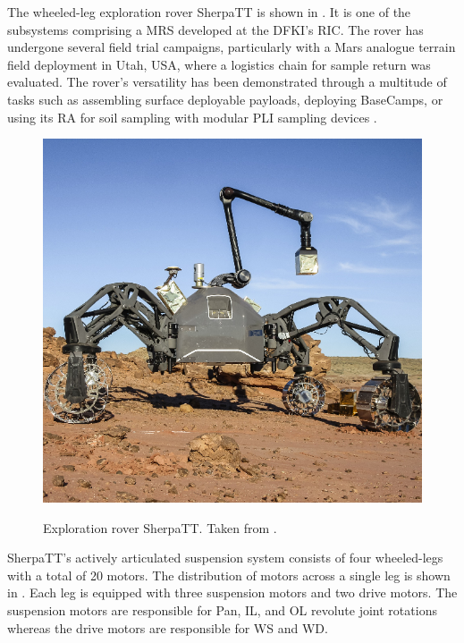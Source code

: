 The wheeled-leg exploration rover SherpaTT is shown in . It is one of the subsystems comprising a \ac{MRS} developed at the \ac{DFKI}'s \ac{RIC}. The rover has undergone several field trial campaigns, particularly with a Mars analogue terrain field deployment  in Utah, USA, where a logistics chain for sample return was evaluated. The rover's versatility has been demonstrated through a multitude of tasks such as assembling surface deployable payloads, deploying BaseCamps, or using its \ac{RA} for soil sampling with modular \ac{PLI} sampling devices .

\begin{figure}[h]
  \centering
  \hypersetup{linkcolor=captionTextColor}
  \includegraphics[width=0.6\linewidth]{sections/introduction/background/images/sherpa-tt.png}\\
  \caption[Exploration rover SherpaTT]
          {Exploration rover SherpaTT. Taken from .}
  \label{fig:sherpatt}
\end{figure}


SherpaTT's actively articulated suspension system consists of four wheeled-legs with a total of 20 motors. The distribution of motors across a single leg is shown in . Each leg is equipped with three suspension motors and two drive motors. The suspension motors are responsible for Pan, \ac{IL}, and \ac{OL} revolute joint rotations whereas the drive motors are responsible for \ac{WS} and \ac{WD}.

